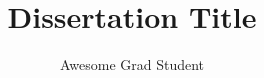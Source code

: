 \documentclass[manuscript,draft]{ucalgmthesis}
\title{Dissertation Title}
\author{Awesome Grad Student}
\begin{document}
\frontmatter





\mainmatter
\glsresetall %










\appendix

\end{document}
